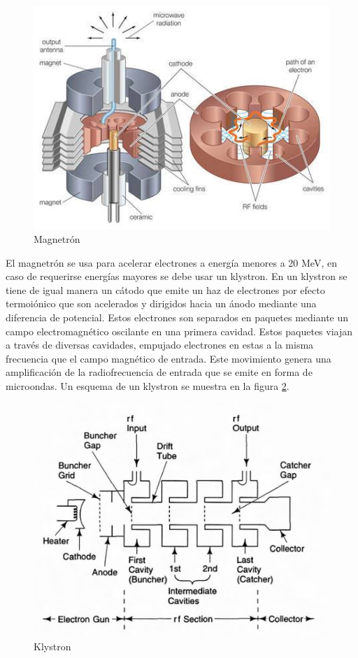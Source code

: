 \begin{figure}[H]
	\centering
	\includegraphics[width=0.7\linewidth]{images/magnetron.jpg}
	\caption{Magnetrón\cite{magne}}
	\label{fig:magnetron}
\end{figure}

El magnetrón se usa para acelerar electrones a energía menores a 20 MeV, en caso de requerirse energías mayores se debe usar un klystron. En un klystron se tiene de igual manera un cátodo que emite un haz de electrones por efecto termoiónico que son acelerados y dirigidos hacia un ánodo mediante una diferencia de potencial. Estos electrones son separados en paquetes mediante un campo electromagnético oscilante en una primera cavidad. Estos paquetes viajan a través de diversas cavidades, empujado electrones en estas a la misma frecuencia que el campo magnético de entrada. Este movimiento genera una amplificación de la radiofrecuencia de entrada que se emite en forma de microondas. Un esquema de un klystron se muestra en la figura \ref{fig:klystron}.\\

\begin{figure}[H]
	\centering
	\includegraphics[width=0.7\linewidth]{images/klystron.png}
	\caption{Klystron\cite{karzmark1993medical}}
	\label{fig:klystron}
\end{figure}

